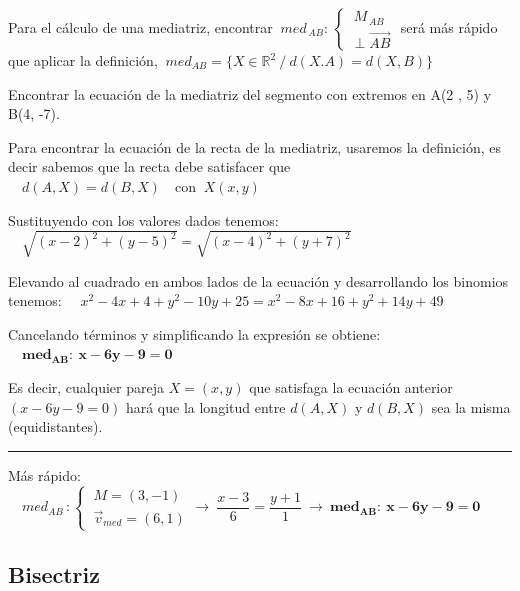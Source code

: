Para el cálculo de una mediatriz, encontrar $\ med_{\, AB}:\, \begin{cases} \ M_{\, AB} \\ \perp \overrightarrow{AB} \end{cases}$ será más rápido que aplicar la definición, $\ med_{AB} = \{ X\in \mathbb R^2 \ \big/ \ d(X.A)=d(X,B)  \}$
 
\begin{miejemplo}
	


Encontrar la ecuación de la mediatriz del segmento con extremos en A(2 , 5) y B(4, -7).

\vspace{5mm} Para encontrar la ecuación de la recta de la mediatriz, usaremos la definición, es decir sabemos que la recta debe satisfacer que
$\quad d(A,X)=d(B,X) \quad \text{con } \ X(x,y) $
     
\vspace{2mm} Sustituyendo con los valores dados tenemos:$\quad \sqrt{(x-2)^2+(y-5)^2}=\sqrt{(x-4)^2+(y+7)^2}$
     
\vspace{2mm} Elevando al cuadrado en ambos lados de la ecuación y desarrollando los binomios tenemos: $\quad x^2-4x+4+y^2-10y+25=x^2-8x+16+y^2+14y+49$ 

\vspace{2mm} Cancelando términos y simplificando la expresión se obtiene:
$\quad \boldsymbol{med_{AB}:\  x-6y-9=0}$
 
\vspace{2mm} Es decir, cualquier pareja  $X=(x,y)$ que satisfaga la ecuación anterior $(x-6y-9=0)$ hará que la longitud entre $d(A, X)$ y $d(B, X)$ sea la misma (equidistantes).

\vspace{4mm}
\begin{center}
\rule{250pt}{0.1pt}

Más rápido: $\quad med_{AB} \, : \begin{cases} \ M=(3,-1) \\ \ \vec 	v_{med}=(6,1) \end{cases} \to \ \dfrac{x-3}{6}=\dfrac{y+1}{1} \ \to \ \boldsymbol{med_{AB}:\  x-6y-9=0}$
\end{center}

\end{miejemplo}

\vspace{5mm}

\subsection{Bisectriz}
\vspace{0.5cm}

